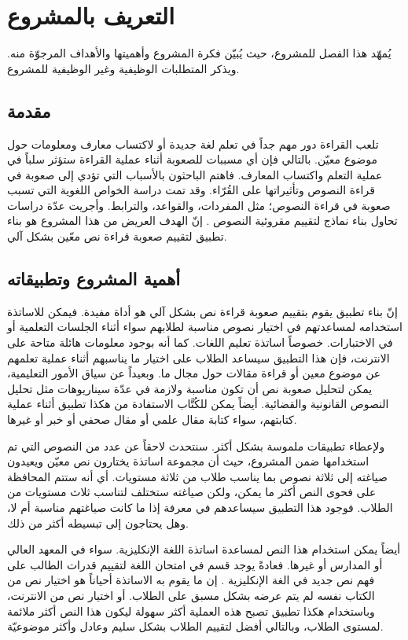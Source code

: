 

\chapter{التعريف بالمشروع}
يُمهّد هذا الفصل للمشروع، حيث يُبيّن فكرة المشروع وأهميتها والأهداف المرجوّة منه. ويذكر المتطلبات الوظيفية وغير الوظيفية للمشروع.


\section{مقدمة}
تلعب القراءة دور مهم جداً في تعلم لغة جديدة أو لاكتساب معارف ومعلومات حول موضوع معيّن.
بالتالي فإن أي مسببات للصعوبة أثناء عملية القراءة ستؤثر سلباً في عملية التعلم واكتساب المعارف.
فاهتم الباحثون بالأسباب التي تؤدي إلى صعوبة في قراءة النصوص وتأثيراتها على القُرّاء.
وقد تمت دراسة الخواص اللغوية التي تسبب صعوبة في قراءة النصوص؛
مثل المفردات، والقواعد، والترابط.
وأجريت عدّة دراسات تحاول بناء نماذج لتقييم مقروئية النصوص .
إنّ الهدف العريض من هذا المشروع هو بناء تطبيق لتقييم صعوبة قراءة نص معّين بشكل آلي.

\section{أهمية المشروع وتطبيقاته}
إنّ بناء تطبيق يقوم بتقييم صعوبة قراءة نص بشكل آلي هو أداة مفيدة.
فيمكن للاساتذة استخدامه لمساعدتهم في اختيار نصوص مناسبة لطلابهم سواء أثناء الجلسات التعلمية أو في الاختبارات.
خصوصاً اساتذة تعليم اللغات.
كما أنه بوجود معلومات هائلة متاحة على الانترنت،
فإن هذا التطبيق سيساعد الطلاب على اختيار ما يناسبهم أثناء عملية تعلمهم عن موضوع معين أو قراءة مقالات حول مجال ما.
وبعيداً عن سياق الأمور التعليمية،
يمكن لتحليل صعوبة نص أن تكون مناسبة ولازمة في عدّة سيناريوهات مثل تحليل النصوص القانونية والقضائية.
أيضاً يمكن للكُتَّاب الاستفادة من هكذا تطبيق أثناء عملية كتابتهم، سواء كتابة مقال علمي أو مقال صحفي أو خبر أو غيرها.

ولإعطاء تطبيقات ملموسة بشكل أكثر.
سنتحدث لاحقاً عن عدد من النصوص التي تم استخدامها ضمن المشروع،
حيث أن مجموعة اساتذة يختارون نص معيّن ويعيدون صياغته إلى ثلاثة نصوص بما يناسب طلاب من ثلاثة مستويات.
أي أنه ستتم المحافظة على فحوى النص أكثر ما يمكن، ولكن صياغته ستختلف لتناسب ثلاث مستويات من الطلاب.
فوجود هذا التطبيق سيساعدهم في معرفة إذا ما كانت صياغتهم مناسبة أم لا، وهل يحتاجون إلى تبسيطه أكثر من ذلك.

أيضاً يمكن استخدام هذا النص لمساعدة اساتذة اللغة الإنكليزية.
سواء في المعهد العالي أو المدارس أو غيرها.
فعادةً يوجد قسم في امتحان اللغة لتقييم قدرات الطالب على فهم نص جديد في الغة الإنكليزية .
إن ما يقوم به الاساتذة أحياناً هو اختيار نص من الكتاب نفسه لم يتم عرضه بشكل مسبق على الطلاب.
أو اختيار نص من الانترنت، وباستخدام هكذا تطبيق تصبح هذه العملية أكثر سهولة ليكون هذا النص أكثر ملائمة لمستوى الطلاب،
وبالتالي أفضل لتقييم الطلاب بشكل سليم وعادل وأكثر موضوعيّة.

